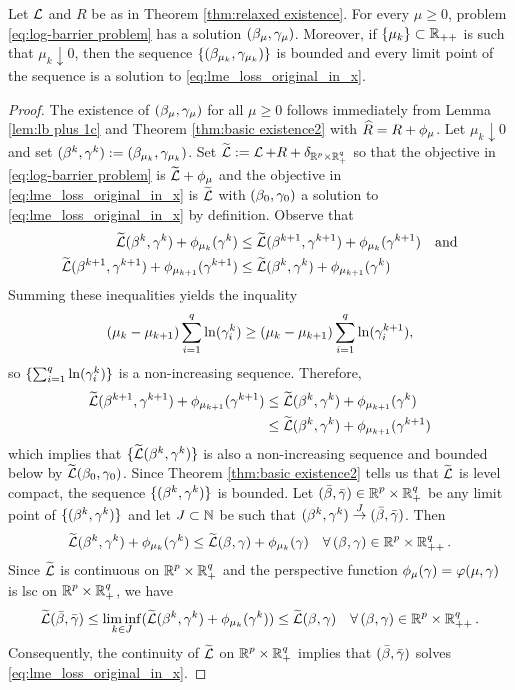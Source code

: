 \begin{theorem}
\label{thm:mu consistency}
Let $\LL$ and $R$ be as in Theorem \ref{thm:relaxed existence}. 
For every $\mu\ge 0$, problem 
\eqref{eq:log-barrier problem} has a solution $(\beta_\mu,\gam_\mu)$.
Moreover, if $\{\mu_k\}\subset\R_{++}$ is such that $\mu_k\downarrow 0$,
then the sequence $\{(\beta_{\mu_k},\gam_{\mu_k})\}$ is bounded
and every limit point of the sequence %
is a 
solution to \eqref{eq:lme_loss_original_in_x}.
\end{theorem}
\begin{proof}
The existence of $(\beta_\mu,\gam_\mu)$ for all $\mu\ge 0$ 
follows immediately from 
Lemma \ref{lem:lb plus 1c} and Theorem \ref{thm:basic existence2} with
$\hR=R+\phimu$. 
Let $\mu_k\downarrow 0$
and set $(\beta^k,\gam^k):=(\beta_{\mu_k},\gam_{\mu_k})$.
Set $\tLL:=\LL+R+\del_{\Rp\times\Rqp}$ so that 
the objective in \eqref{eq:log-barrier problem} is $\tLL+\phimu$
and the objective in \eqref{eq:lme_loss_original_in_x} is $\tLL$
with $(\beta_0,\gam_0)$ a solution to \eqref{eq:lme_loss_original_in_x}
by definition. 
Observe that
\[\begin{aligned}
\tLL\bgk+\phi_{\mu_k}(\gam^k)&\le 
\tLL(\beta^{k+1},\gam^{k+1})+\phi_{\mu_k}(\gam^{k+1})\quad \text{and}
\\
\tLL(\beta^{k+1},\gam^{k+1})+\phi_{\mu_{k+1}}(\gam^{k+1})&\le 
\tLL(\beta^{k},\gam^{k})+\phi_{\mu_{k+1}}(\gam^k)
\end{aligned}\]
Summing these inequalities yields the inquality
\[
(\mu_k-\mu_{k+1})\sum_{i=1}^q\ln(\gam^{k}_i)
\ge 
(\mu_k-\mu_{k+1})\sum_{i=1}^q\ln(\gam^{k+1}_i),
\]
so $\{\sum_{i=1}^q\ln(\gam^{k}_i)\}$ is a non-increasing sequence.
Therefore,
\[\begin{aligned}
\tLL(\beta^{k+1},\gam^{k+1})+\phi_{\mu_{k+1}}(\gam^{k+1})&\le 
\tLL(\beta^{k},\gam^{k})+\phi_{\mu_{k+1}}(\gam^k)
\\ &\le
\tLL(\beta^{k},\gam^{k})+\phi_{\mu_{k+1}}(\gam^{k+1})
\end{aligned}\]
which implies that $\{\tLL(\beta^{k},\gam^{k})\}$
is also a non-increasing sequence and bounded below by 
$\tLL(\beta_0,\gam_0)$. 
Since
Theorem \ref{thm:basic existence2} tells us that $\tLL$ is level compact,
the sequence $\{\bgk\}$ is bounded. 
Let $(\bbeta,\bgam)\in\Rp\times\Rqp$ be any
limit point of $\{\bgk\}$ and let $J\subset\N$ be such that
$\bgk\overset{J}{\rightarrow}(\bbeta,\bgam)$. Then
\[
\tLL\bgk+\phi_{\mu_k}(\gam^k)\le
\tLL\bg+\phi_{\mu_k}(\gam) \quad \forall\,\bg\in\Rp\times\R^q_{++}.
\]
Since $\tLL$ is continuous on $\Rp\times\Rqp$ and the perspective function
$\phi_{\mu}(\gam)=\varphi(\mu,\gam)$ is lsc on $\Rp\times\Rqp$, we have
\[
\tLL(\bbeta,\bgam)\le\liminf_{k\in J}(\tLL\bgk+\phi_{\mu_k}(\gam^k))\le
\tLL\bg \quad \forall\,\bg\in\Rp\times\R^q_{++}.
\]
Consequently, the continuity of $\tLL$ on $\Rp\times\Rqp$ implies
that $(\bbeta,\bgam)$ solves \eqref{eq:lme_loss_original_in_x}.
\end{proof}


